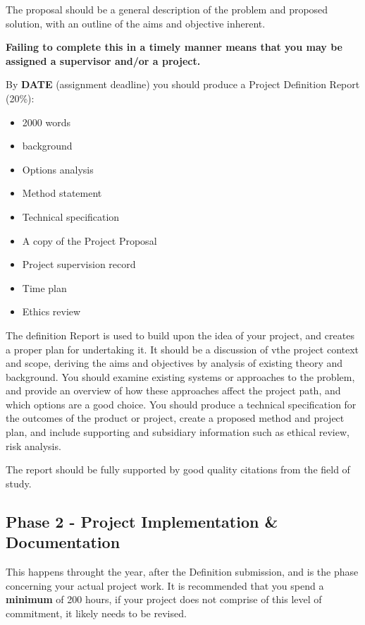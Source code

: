 The proposal should be a general description of the problem and proposed solution, with an outline of the aims and objective inherent. 

\medskip

\textbf{Failing to complete this in a timely manner means that you may be assigned a supervisor and/or a project.}

\medskip

By \textbf{DATE} (assignment deadline) you should produce a Project Definition Report (20\%):

\begin{itemize}
    \item 2000 words
    \item background
    \item Options analysis
    \item Method statement
    \item Technical specification
    \item A copy of the Project Proposal
    \item Project supervision record
    \item Time plan
    \item Ethics review
\end{itemize}

The definition Report is used to build upon the idea of your project, and creates a proper plan for undertaking it. It should be a discussion of vthe project context and scope, deriving the aims and objectives by analysis of existing theory and background. You should examine existing systems or approaches to the problem, and provide an overview of how these approaches affect the project path, and which options are a good choice. You should produce a technical specification for the outcomes of the product or project, create a proposed method and project plan, and include supporting and subsidiary information such as ethical review, risk analysis. 

The report should be fully supported by good quality citations from the field of study.

\subsection{Phase 2 - Project Implementation \& Documentation}

This happens throught the year, after the Definition submission, and is the phase concerning your actual project work. It is recommended that you spend a \textbf{minimum} of 200 hours, if your project does not comprise of this level of commitment, it likely needs to be revised.

